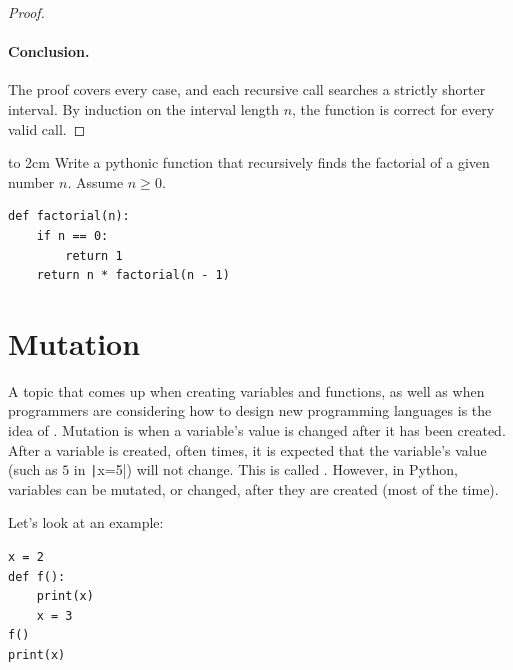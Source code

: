 \begin{proof}
    \paragraph{Conclusion.} The proof covers every case, and each recursive call searches a strictly shorter interval. By induction on the interval length $n$, the function is correct for every valid call. 
\end{proof}

\begin{Exercise}[title={Recursive Factorial}, label={ex:factorial}]

  \vspace{2cm}

  \begin{center}
    \vbox to 2cm{\vfil
        Write a pythonic function that recursively finds the factorial of a given number $n$. Assume $n \ge 0$.
        \vfil}
  \end{center}
\end{Exercise}
\begin{Answer}[ref={ex:factorial}]
\begin{verbatim}    
def factorial(n):
    if n == 0:
        return 1
    return n * factorial(n - 1)
\end{verbatim}
\end{Answer}

\section{Mutation}

A topic that comes up when creating variables and functions, as well as when programmers are considering how to design new programming languages is the idea of . Mutation is when a variable's value is changed after it has been created. 
After a variable is created, often times, it is expected that the variable's value (such as $5$ in \texttt|x=5|) will not change. This is called . However, in Python, variables can be mutated, or changed, after they are created (most of the time).

Let's look at an example:
\begin{listing}[H]
\begin{verbatim}
x = 2
def f():
    print(x)
    x = 3
f()
print(x)
\end{verbatim}
\caption{Assigning to a variable inside a function after reading it}
\label{lst:unbound-local}
\end{listing}


